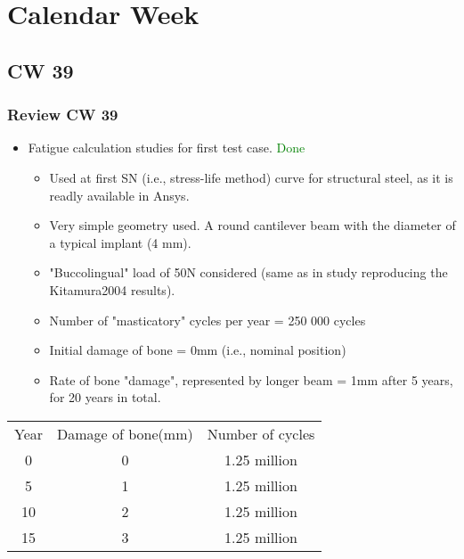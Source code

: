 \section{Calendar Week}
\subsection{CW 39}
\begin{frame}
  \frametitle{Review CW 39}
	\begin{itemize}
		\item Fatigue calculation studies for first test case. \textcolor{green}{Done}
		\begin{itemize}
			\item Used at first SN (i.e., stress-life method) curve for structural steel, as it is readly available in Ansys.
			\item Very simple geometry used. A round cantilever beam with the diameter of a typical implant (4 mm).
			\item "Buccolingual" load of 50N considered (same as in study reproducing the Kitamura2004 results).
			\item Number of "masticatory" cycles per year = 250 000 cycles
			\item Initial damage of bone = 0mm (i.e., nominal position)
			\item Rate of bone "damage", represented by longer beam = 1mm after 5 years, for 20 years in total.
		\end{itemize}
	\end{itemize}
	\begin{center}
	\begin{tabular}{|c|c|c|} 
 		\hline
 		Year & Damage of bone(mm) & Number of cycles\\ 
 		0  & 0 & 1.25 million \\ 
 		5  & 1 & 1.25 million \\ 
 		10 & 2 & 1.25 million \\ 
 		15 & 3 & 1.25 million \\ 
		\hline
	\end{tabular}
	\end{center}
\end{frame}

